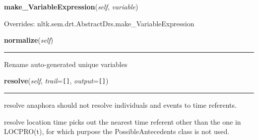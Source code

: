 \hspace{.8\funcindent}\begin{boxedminipage}{\funcwidth}

    \raggedright \textbf{make\_VariableExpression}(\textit{self}, \textit{variable})

\setlength{\parskip}{2ex}
\setlength{\parskip}{1ex}
      Overrides: nltk.sem.drt.AbstractDrs.make\_VariableExpression

    \end{boxedminipage}

    \label{temporaldrt:AbstractDrs:normalize}

    \vspace{0.5ex}

\hspace{.8\funcindent}\begin{boxedminipage}{\funcwidth}

    \raggedright \textbf{normalize}(\textit{self})

    \vspace{-1.5ex}

    \rule{\textwidth}{0.5\fboxrule}
\setlength{\parskip}{2ex}
    Rename auto-generated unique variables

\setlength{\parskip}{1ex}
    \end{boxedminipage}

    \label{temporaldrt:AbstractDrs:resolve}

    \vspace{0.5ex}

\hspace{.8\funcindent}\begin{boxedminipage}{\funcwidth}

    \raggedright \textbf{resolve}(\textit{self}, \textit{trail}={\tt \texttt{[}\texttt{]}}, \textit{output}={\tt \texttt{[}\texttt{]}})

    \vspace{-1.5ex}

    \rule{\textwidth}{0.5\fboxrule}
\setlength{\parskip}{2ex}
    resolve anaphora should not resolve individuals and events to time 
    referents.

    resolve location time picks out the nearest time referent other than 
    the one in LOCPRO(t), for which purpose the PossibleAntecedents class 
    is not used.

\setlength{\parskip}{1ex}
    \end{boxedminipage}


